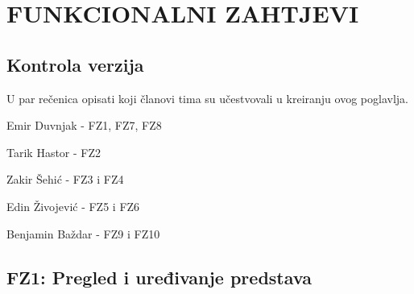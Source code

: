 \sloppy
\chapter{FUNKCIONALNI ZAHTJEVI}

\sloppy
\section*{Kontrola verzija}

U par rečenica opisati koji članovi tima su učestvovali u kreiranju ovog poglavlja.

\noindent Emir Duvnjak - FZ1, FZ7, FZ8

\noindent Tarik Hastor - FZ2

\noindent Zakir Šehić - FZ3 i FZ4

\noindent Edin Živojević - FZ5 i FZ6

\noindent Benjamin Baždar - FZ9 i FZ10


\sloppy  
\section{FZ1: Pregled i uređivanje predstava}  

\sloppy  
